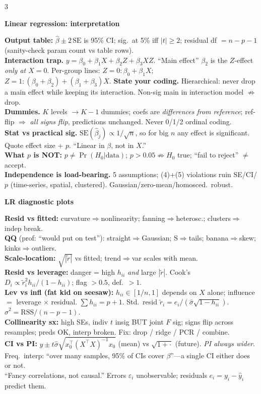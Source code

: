 \documentclass[a4paper,9pt]{extarticle}
\newcommand{\hd}[1]{\textbf{#1}}
\newcommand{\sect}[1]{\par\vspace{1pt}\noindent\colorbox{black!10}{\parbox{\dimexpr\linewidth-2\fboxsep\relax}{\strut\textbf{#1}\strut}}\par\vspace{1pt}}
\begin{document}
\begin{multicols*}{3}
\sect{Linear regression: interpretation}
\hd{Output table:} $\hat\beta\pm 2\,\mathrm{SE}$ is 95\% CI; sig.\ at 5\% iff $|t|\ge 2$; residual df $=n-p-1$ (sanity-check param count vs table rows).\\
\hd{Interaction trap.} $y=\beta_0+\beta_1 X+\beta_2 Z+\beta_3 XZ$. ``Main effect'' $\beta_2$ is the $Z$-effect \emph{only at $X=0$}. Per-group lines: $Z=0:\beta_0+\beta_1 X$; $Z=1:(\beta_0+\beta_2)+(\beta_1+\beta_3)X$. \hd{State your coding.} Hierarchical: never drop a main effect while keeping its interaction. Non-sig main in interaction model $\not\Rightarrow$ drop.\\
\hd{Dummies.} $K$ levels $\to K{-}1$ dummies; coefs are \emph{differences from reference}; ref-flip $\Rightarrow$ \emph{all signs flip}, predictions unchanged. Never 0/1/2 ordinal coding.\\
\hd{Stat vs practical sig.} $\mathrm{SE}(\hat\beta_j)\propto 1/\sqrt n$, so for big $n$ any effect is significant. Quote effect size + $p$. ``Linear in $\beta$, not in $X$.''\\
\hd{What $p$ is NOT:} $p\ne\Pr(H_0|\text{data})$; $p>0.05\not\Rightarrow H_0$ true; ``fail to reject'' $\ne$ accept.\\
\hd{Independence is load-bearing.} 5 assumptions; (4)+(5) violations ruin SE/CI/$p$ (time-series, spatial, clustered). Gaussian/zero-mean/homosced.\ robust.

\sect{LR diagnostic plots}
\hd{Resid vs fitted:} curvature$\Rightarrow$nonlinearity; fanning$\Rightarrow$heterosc.; clusters$\Rightarrow$indep break.\\
\hd{QQ} (prof: ``would put on test''): straight$\Rightarrow$Gaussian; S$\Rightarrow$tails; banana$\Rightarrow$skew; kinks$\Rightarrow$outliers.\\
\hd{Scale-location:} $\sqrt{|\tilde r|}$ vs fitted; trend$\Rightarrow$var scales with mean.\\
\hd{Resid vs leverage:} danger = high $h_{ii}$ \emph{and} large $|\tilde r|$. Cook's $D_i\propto\tilde r_i^2 h_{ii}/(1-h_{ii})$; flag $>0.5$, def.\ $>1$.\\
\hd{Lev vs infl (fat kid on seesaw):} $h_{ii}\in[1/n,1]$ depends on $X$ alone; influence $=$ leverage $\times$ residual. $\sum h_{ii}=p+1$. Std.\ resid $\tilde r_i=e_i/(\hat\sigma\sqrt{1-h_{ii}})$. $\hat\sigma^2=\mathrm{RSS}/(n-p-1)$.\\
\hd{Collinearity sx:} high SEs, indiv $t$ insig BUT joint $F$ sig; signs flip across resamples; preds OK, interp broken. Fix: drop / ridge / PCR / combine.\\
\hd{CI vs PI:} $\hat y\pm t\hat\sigma\sqrt{x_0^\top(X^\top X)^{-1}x_0}$ (mean) vs $\sqrt{1+\cdot}$ (future). \emph{PI always wider}. Freq.\ interp: ``over many samples, 95\% of CIs cover $\beta$''---a single CI either does or not.\\
``Fancy correlations, not causal.'' Errors $\varepsilon_i$ unobservable; residuals $e_i=y_i-\hat y_i$ predict them.


\end{multicols*}
\end{document}
